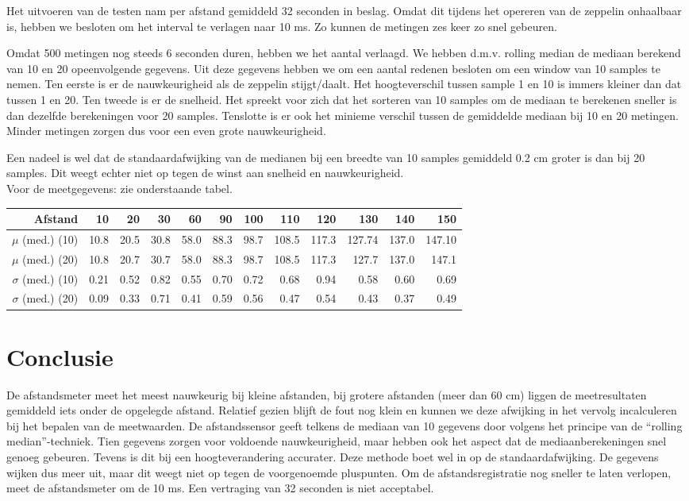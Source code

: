\documentclass{peno-opdracht3}
\begin{document}
Het uitvoeren van de testen nam per afstand gemiddeld 32 seconden in beslag. Omdat dit tijdens het opereren van de zeppelin onhaalbaar is, hebben we besloten om het interval te verlagen naar 10 ms. Zo kunnen de metingen zes keer zo snel gebeuren. 

Omdat 500 metingen nog steeds 6 seconden duren, hebben we het aantal verlaagd. We hebben d.m.v. rolling median de mediaan berekend van 10 en 20 opeenvolgende gegevens. Uit deze gegevens hebben we om een aantal redenen besloten om een window van 10 samples te nemen.  Ten eerste is er de nauwkeurigheid als de zeppelin stijgt/daalt. Het hoogteverschil tussen sample 1 en 10 is immers kleiner dan dat tussen 1 en 20. Ten tweede is er de snelheid. Het spreekt voor zich dat het sorteren van 10 samples om de mediaan te berekenen sneller is dan dezelfde berekeningen voor 20 samples. Tenslotte is er ook het minieme verschil tussen de gemiddelde mediaan bij 10 en 20 metingen. Minder metingen zorgen dus voor een even grote nauwkeurigheid. 

Een nadeel is wel dat de standaardafwijking van de medianen bij een breedte van 10 samples gemiddeld 0.2 cm groter is dan bij 20 samples. Dit weegt echter niet op tegen de winst aan snelheid en nauwkeurigheid.\\ 

Voor de meetgegevens: zie onderstaande tabel. \\

\begin{tabular}{r||r|r|r|r|r|r|r|r|r|r|r}
\textbf{Afstand} & 10 & 20 & 30 & 60 & 90 & 100 & 110 & 120 & 130 & 140 & 150 \\
\hline \hline 
$\mu$ (med.) (10) & 10.8 & 20.5 & 30.8 & 58.0 & 88.3 & 98.7 & 108.5 & 117.3 & 127.74 & 137.0 & 147.10 \\
$\mu$ (med.) (20) & 10.8 & 20.7 & 30.7 & 58.0 & 88.3 & 98.7 & 108.5 & 117.3 & 127.7 & 137.0 & 147.1 \\
$\sigma$ (med.) (10) & 0.21 & 0.52 & 0.82 & 0.55 & 0.70 & 0.72 & 0.68 & 0.94 & 0.58 & 0.60 & 0.69 \\
$\sigma$ (med.) (20)& 0.09 & 0.33 & 0.71 & 0.41 & 0.59 & 0.56 & 0.47 & 0.54 & 0.43 & 0.37 & 0.49 \\
\end{tabular}
\section{Conclusie}
De afstandsmeter meet het meest nauwkeurig bij kleine afstanden, bij grotere afstanden (meer dan 60 cm) liggen de meetresultaten gemiddeld iets onder de opgelegde afstand. Relatief gezien blijft de fout nog klein en kunnen we deze afwijking in het vervolg incalculeren bij het bepalen van de meetwaarden. De afstandssensor geeft telkens de mediaan van 10 gegevens door volgens het principe van de “rolling median”-techniek. Tien gegevens zorgen voor voldoende nauwkeurigheid, maar hebben ook het aspect dat de mediaanberekeningen snel genoeg gebeuren. Tevens is dit bij een hoogteverandering accurater. Deze methode boet wel in op de standaardafwijking. De gegevens wijken dus meer uit, maar dit weegt niet op tegen de voorgenoemde pluspunten. Om de afstandsregistratie nog sneller te laten verlopen, meet de afstandsmeter om de 10 ms. Een vertraging van 32 seconden is niet acceptabel.
\end{document}
